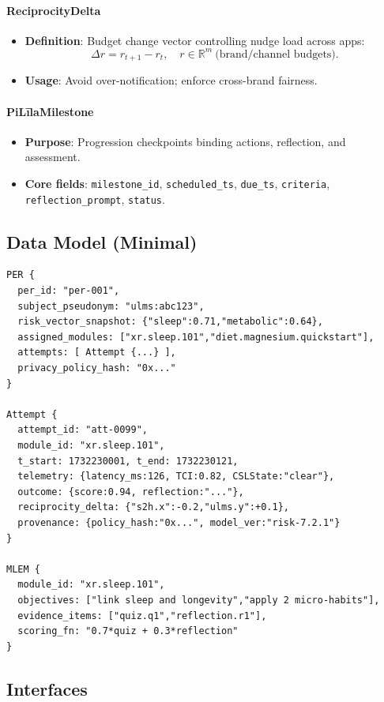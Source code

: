 \documentclass[11pt]{article}
\theoremstyle{plain}
\begin{document}
\paragraph{ReciprocityDelta}
\begin{itemize}
  \item \textbf{Definition}: Budget change vector controlling nudge load across apps:
  \[
  \Delta r = r_{t+1}-r_t,\quad r\in\mathbb{R}^m \ \text{(brand/channel budgets)}.
  \]
  \item \textbf{Usage}: Avoid over-notification; enforce cross-brand fairness.
\end{itemize}

\paragraph{PiLīlaMilestone}
\begin{itemize}
  \item \textbf{Purpose}: Progression checkpoints binding actions, reflection, and assessment.
  \item \textbf{Core fields}: \texttt{milestone\_id}, \texttt{scheduled\_ts}, \texttt{due\_ts}, \texttt{criteria}, \texttt{reflection\_prompt}, \texttt{status}.
\end{itemize}

\subsection{Data Model (Minimal)}
\begin{verbatim}
PER {
  per_id: "per-001",
  subject_pseudonym: "ulms:abc123",
  risk_vector_snapshot: {"sleep":0.71,"metabolic":0.64},
  assigned_modules: ["xr.sleep.101","diet.magnesium.quickstart"],
  attempts: [ Attempt {...} ],
  privacy_policy_hash: "0x..."
}

Attempt {
  attempt_id: "att-0099",
  module_id: "xr.sleep.101",
  t_start: 1732230001, t_end: 1732230121,
  telemetry: {latency_ms:126, TCI:0.82, CSLState:"clear"},
  outcome: {score:0.94, reflection:"..."},
  reciprocity_delta: {"s2h.x":-0.2,"ulms.y":+0.1},
  provenance: {policy_hash:"0x...", model_ver:"risk-7.2.1"}
}

MLEM {
  module_id: "xr.sleep.101",
  objectives: ["link sleep and longevity","apply 2 micro-habits"],
  evidence_items: ["quiz.q1","reflection.r1"],
  scoring_fn: "0.7*quiz + 0.3*reflection"
}
\end{verbatim}

\subsection{Interfaces}
\end{document}
